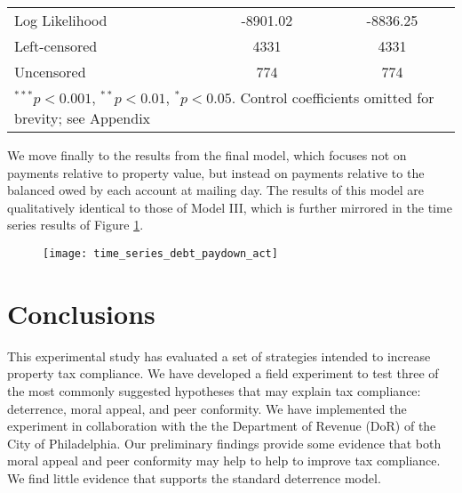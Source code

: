 \documentclass[12pt,titlepage]{article}
\begin{document}
\begin{table}
\begin{center}
\begin{tabular}{l c c }
Log Likelihood         & -8901.02         & -8836.25          \\
Left-censored          & 4331             & 4331              \\
Uncensored             & 774              & 774               \\
\hline
\multicolumn{3}{l}{\scriptsize{$^{***}p<0.001$, $^{**}p<0.01$, $^*p<0.05$. Control coefficients omitted for brevity; see Appendix}}
\end{tabular}
\end{center}
\end{table}

We move finally to the results from the final model, which focuses not
on payments relative to property value, but instead on payments
relative to the balanced owed by each account at mailing day. The
results of this model are qualitatively identical to those of Model
III, which is further mirrored in the time series results of Figure
\ref{drawdown_quart_act}.

\begin{figure}[htbp]
\begin{center}
\caption{}\label{drawdown_quart_act}
\texttt{[image: time\_series\_debt\_paydown\_act]}
\par\end{center}
\end{figure}

\newpage

\section{Conclusions}

This experimental study has evaluated a set of
strategies intended to increase property tax compliance. We have developed  a field experiment to test three of the most commonly
suggested hypotheses that may explain tax compliance: deterrence, moral appeal, and peer conformity.
We have implemented the experiment in collaboration with the the Department of Revenue (DoR) of the City
of Philadelphia. Our preliminary findings provide some evidence that both moral appeal
and peer conformity may help to help to improve tax compliance. We find
little evidence that supports the standard deterrence model.
\end{document}
